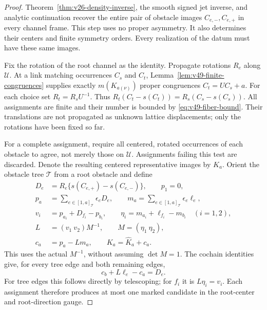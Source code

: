 \begin{proof}
Theorem~\ref{thm:v26-density-inverse}, the smooth signed jet inverse,
and analytic continuation recover the entire pair of obstacle images
$C_{e,-},C_{e,+}$ in every channel frame.  This step uses no proper
asymmetry.  It also determines their centers and finite symmetry orders.
Every realization of the datum must have these same images.

Fix the rotation of the root channel as the identity.  Propagate
rotations $R_e$ along $\mathcal U$.  At a link matching occurrences
$C_s$ and $C_t$, Lemma~\ref{lem:v49-finite-congruences} supplies exactly
$m(K_{a(\nu)})$ proper congruences $C_t=UC_s+a$.  For each choice set
$R_t=R_sU^{-1}$.  Thus $R_t(C_t-s(C_t))=R_s(C_s-s(C_s))$.
All assignments are finite and their number is bounded by
\eqref{eq:v49-fiber-bound}.  Their translations are not propagated as
unknown lattice displacements; only the rotations have been fixed so far.

For a complete assignment, require all centered, rotated occurrences
of each obstacle to agree, not merely those on $\mathcal U$.
Assignments failing this test are discarded.  Denote the resulting
centered representative images by $\widehat K_a$.  Orient the obstacle
tree $\mathcal T$ from a root obstacle and define
\begin{equation}\label{eq:v49-candidate-cochain}
 \begin{split}
 D_e&=R_e\{s(C_{e,+})-s(C_{e,-})\},\qquad p_1=0,\\
 p_a&=\sum_{e\in[1,a]_{\mathcal T}}\epsilon_e D_e,\qquad
 m_a=\sum_{e\in[1,a]_{\mathcal T}}\epsilon_e\ell_e,\\
 v_i&=p_{a_i}+D_{f_i}-p_{b_i},\qquad
 \eta_i=m_{a_i}+\ell_{f_i}-m_{b_i}\quad(i=1,2),\\
 L&=(v_1\ v_2)M^{-1},\qquad M=(\eta_1\ \eta_2),\\
 c_a&=p_a-Lm_a,\qquad K_a=\widehat K_a+c_a.
 \end{split}
\end{equation}
This uses the actual $M^{-1}$, without assuming $\det M=1$.
The cochain identities give, for every tree edge and both remaining
edges,
\begin{equation}\label{eq:v49-edge-consistency}
                 c_b+L\ell_e-c_a=D_e.
\end{equation}
For tree edges this follows directly by telescoping; for $f_i$ it is
$L\eta_i=v_i$.  Each assignment therefore produces at most one marked
candidate in the root-center and root-direction gauge.


\end{proof}
